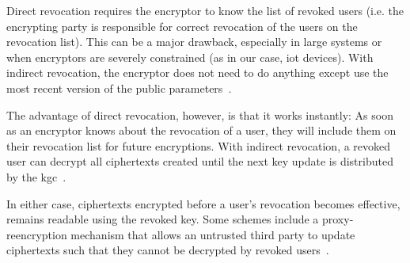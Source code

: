 Direct revocation requires the encryptor to know the list of revoked users \cite{attrapadung_attribute-based_2009} (i.e. the encrypting party is responsible for correct revocation of the users on the revocation list).
This can be a major drawback, especially in large systems or when encryptors are severely constrained (as in our case, \acrshort{iot} devices).
With indirect revocation, the encryptor does not need to do anything except use the most recent version of the public parameters~\cite{attrapadung_attribute-based_2009}.

The advantage of direct revocation, however, is that it works instantly: As soon as an encryptor knows about the revocation of a user, they will include them on their revocation list for future encryptions.
With indirect revocation, a revoked user can decrypt all ciphertexts created until the next key update is distributed by the \acrshort{kgc}~\cite{attrapadung_attribute-based_2009}.

In either case, ciphertexts encrypted before a user's revocation becomes effective, remains readable using the revoked key.
Some schemes include a proxy-reencryption mechanism that allows an untrusted third party to update ciphertexts such that they cannot be decrypted by revoked users~\cite{manna_sea-brew_2021}.




